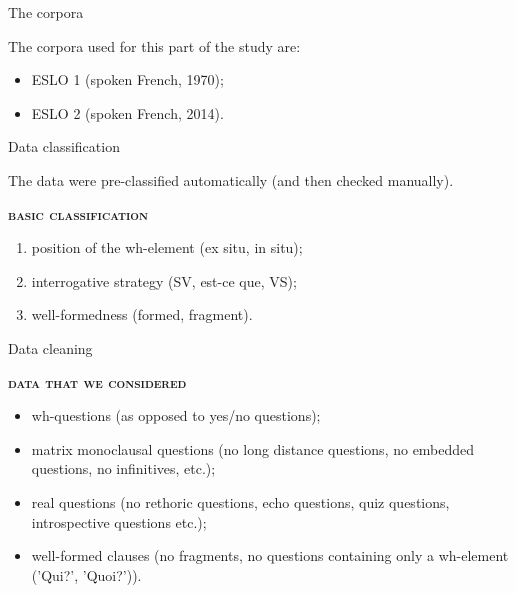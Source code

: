 \documentclass[lesson_slides]{subfiles}
\begin{document}
\begin{frame}[c]{The corpora}

    \noindent The corpora used for this part of the study are: \pause

    \begin{itemize}
        \item[\ding{227}] ESLO 1 (spoken French, 1970); \pause
        \item[\ding{227}] ESLO 2 (spoken French, 2014).
    \end{itemize}
    
\end{frame}
\begin{frame}[c]{Data classification}

    \noindent The data were pre-classified automatically (and then checked manually). \pause

    \textbf{\textsc{basic classification}} \pause
    \begin{enumerate}
        \item position of the wh-element \pause (ex situ, in situ); \pause
        \item interrogative strategy \pause (SV, est-ce que, VS); \pause
        \item well-formedness \pause (formed, fragment). \pause
    \end{enumerate}
    
\end{frame}
\begin{frame}[c]{Data cleaning}

    \textbf{\textsc{data that we considered}} \pause
    
    \begin{itemize}
        \item[\ding{227}] wh-questions \pause (as opposed to yes/no questions); \pause
        \item[\ding{227}] matrix monoclausal questions \pause (no long distance questions, no embedded questions, no infinitives, etc.); \pause
        \item[\ding{227}] real questions \pause (no rethoric questions, echo questions, quiz questions, introspective questions etc.); \pause
        \item[\ding{227}] well-formed clauses \pause (no fragments, no questions containing only a wh-element ('Qui?', 'Quoi?')).
    \end{itemize}
    
\end{frame}
\end{document}
